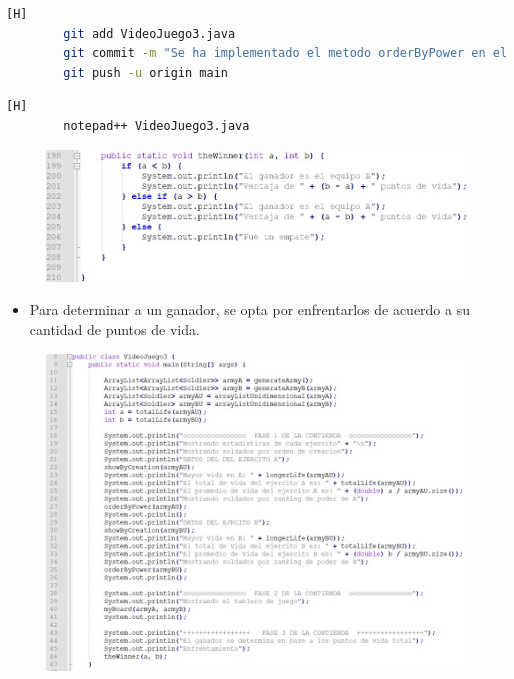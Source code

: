 \documentclass{article}
\begin{document}
	
	
	\begin{lstlisting}[language=bash,caption={Commit:Se ha implementado el metodo orderByPower en el main}][H]
		git add VideoJuego3.java
		git commit -m "Se ha implementado el metodo orderByPower en el main"			
		git push -u origin main
	\end{lstlisting}
	
	
	
	
	
	\begin{lstlisting}[language=bash,caption={Se implementa el método que determina al ganador}][H]
		notepad++ VideoJuego3.java
	\end{lstlisting}
	
	\begin{figure}[H]
		\centering
		\includegraphics[width=1.1\textwidth,keepaspectratio]{img/10.jpg}
	\end{figure}
	
	
	\begin{itemize}	
		\item Para determinar a un ganador, se opta por enfrentarlos de acuerdo a su cantidad de puntos de vida.
	\end{itemize}
	
	
	\begin{figure}[H]
		\centering
		\includegraphics[width=1.1\textwidth,keepaspectratio]{img/main.jpg}
	\end{figure}
	
\end{document}
